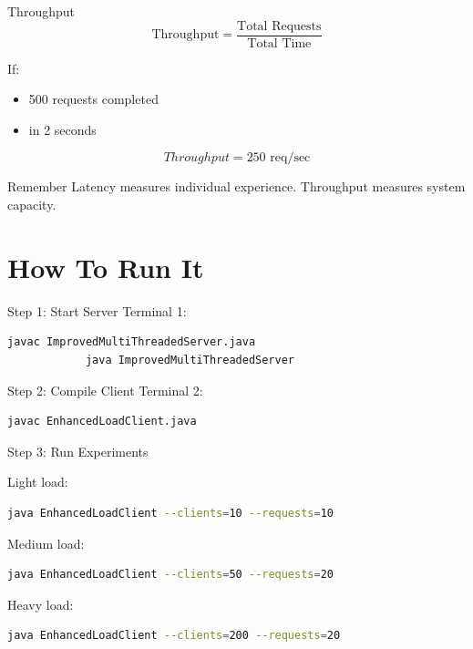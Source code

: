 \documentclass[11pt]{beamer}
\begin{document}
	\begin{frame}{Throughput}
		\[
		\text{Throughput} =
		\frac{\text{Total Requests}}{\text{Total Time}}
		\]

		
		If:
		\begin{itemize}
			\item 500 requests completed
			\item in 2 seconds
		\end{itemize}
		
		\[
		Throughput = 250 \text{ req/sec}
		\]

		
		\begin{block}{Remember}
			Latency measures individual experience.  
			Throughput measures system capacity.
		\end{block}
	\end{frame}
	
	\section{How To Run It}
	
	\begin{frame}[fragile]{Step 1: Start Server}
		Terminal 1:
		
		\begin{lstlisting}[language=bash]
			javac ImprovedMultiThreadedServer.java
			java ImprovedMultiThreadedServer
		\end{lstlisting}
	\end{frame}
	
	\begin{frame}[fragile]{Step 2: Compile Client}
		Terminal 2:
		
		\begin{lstlisting}[language=bash]
			javac EnhancedLoadClient.java
		\end{lstlisting}
	\end{frame}
	
	\begin{frame}[fragile]{Step 3: Run Experiments}
		
		Light load:
		
		\begin{lstlisting}[language=bash]
			java EnhancedLoadClient --clients=10 --requests=10
		\end{lstlisting}

		
		Medium load:
		
		\begin{lstlisting}[language=bash]
			java EnhancedLoadClient --clients=50 --requests=20
		\end{lstlisting}

		
		Heavy load:
		
		\begin{lstlisting}[language=bash]
			java EnhancedLoadClient --clients=200 --requests=20
		\end{lstlisting}
	\end{frame}
	
\end{document}
